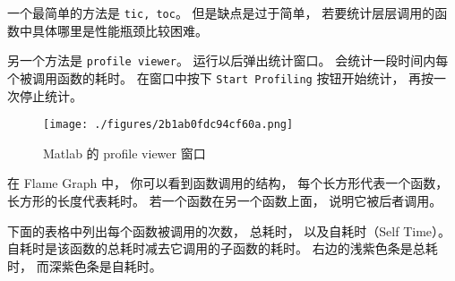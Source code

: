 
\begin{issues}
\issueDraft
\end{issues}


一个最简单的方法是 \verb|tic, toc|。 但是缺点是过于简单， 若要统计层层调用的函数中具体哪里是性能瓶颈比较困难。

另一个方法是 \verb|profile viewer|。 运行以后弹出统计窗口。 会统计一段时间内每个被调用函数的耗时。 在窗口中按下 \verb|Start Profiling| 按钮开始统计， 再按一次停止统计。

\begin{figure}[ht]
\centering
\texttt{[image: ./figures/2b1ab0fdc94cf60a.png]}
\caption{Matlab 的 profile viewer 窗口} \label{fig_MLprof_1}
\end{figure}

在 Flame Graph 中， 你可以看到函数调用的结构， 每个长方形代表一个函数， 长方形的长度代表耗时。 若一个函数在另一个函数上面， 说明它被后者调用。

下面的表格中列出每个函数被调用的次数， 总耗时， 以及自耗时（Self Time）。 自耗时是该函数的总耗时减去它调用的子函数的耗时。 右边的浅紫色条是总耗时， 而深紫色条是自耗时。
